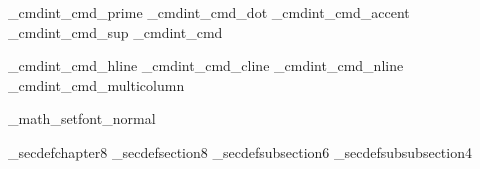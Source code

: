 {\brl@def_cmdint{\brl@math_cmd_prime}
\brl@def_cmdint{\brl@math_cmd_dot}
\brl@def_cmdint{\brl@math_cmd_accent}
\brl@def_cmdint{\brl@math_cmd_sup}%
\brl@def_cmdint{\brl@math_cmd}


\brl@def_cmdint{\brl@array_cmd_hline}
\brl@def_cmdint{\brl@array_cmd_cline}
\brl@def_cmdint{\brl@array_cmd_nline}
\brl@def_cmdint{\brl@array_cmd_multicolumn}



%
%


\def\brl@document_math_setfont_normal{%
  \protected\gdef\brl@math_cmd_normalfont{\def\brl@math@fontprefix{n}}%
  \protected\gdef\brl@math_cmd_rm{\def\brl@math@fontprefix{r}}%
}

\def\brl@document_math_setfont_bold{%
  \protected\gdef\brl@math_cmd_normalfont{\def\brl@math@fontprefix{b}}%
  \protected\gdef\brl@math_cmd_rm{\def\brl@math@fontprefix{b}}%
}

\protected{}%
\protected\def\brl@math_cmd_cal{\def\brl@math@fontprefix{c}}%
\protected\def\brl@math_cmd_frak{\def\brl@math@fontprefix{f}}%
\brl@document_math_setfont_normal%





\def\brl@document_footnote@footnote{\if@english footnote\else 脚注\fi}%
\def\brl@document_footnote@arrayelement{\if@english array data\else 配列要素\fi}%

\brl@env_secdef{chapter}{8}{\thechapter}
\brl@env_secdef{section}{8}{\thesection}
\brl@env_secdef{subsection}{6}{\thesubsection}
\brl@env_secdef{subsubsection}{4}{\thesubsubsection}



\let\brl@mecab@prog\empty
\let\brl@mecab@sysdic\empty
\let\brl@mecab@userdic\empty





}
